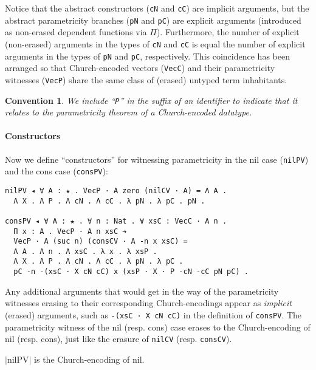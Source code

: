 \documentclass[a4paper,envcountsame,envcountsect]{llncs}
\newtheorem{convention}{Convention}
\newcommand{\lablem}[1]{\label{lem:#1}}
\newcommand{\erase}[1]{\ensuremath{\lvert #1 \rvert}}
\newcommand{\name}[1]{\textrm{#1}}
\begin{document}
Notice that the abstract constructors (\texttt{cN} and \texttt{cC})
are implicit arguments, but the abstract parametricity
branches (\texttt{pN} and \texttt{pC}) are explicit arguments
(introduced as non-erased dependent functions via $\Pi$).
Furthermore, the number of explicit (non-erased) arguments in the types of
\texttt{cN} and \texttt{cC} is equal the number of explicit arguments
in the types of \texttt{pN} and \texttt{pC}, respectively. This
coincidence has been arranged so that Church-encoded vectors
(\texttt{VecC}) and their parametricity witnesses (\texttt{VecP})
share the same class of (erased) untyped term inhabitants.

\begin{convention}
We include ``\texttt{P}'' in
the suffix of an identifier to indicate that it relates to
the parametricity theorem of a Church-encoded datatype.
\end{convention}

\paragraph{Constructors}

Now we define ``constructors'' for witnessing parametricity in the
nil case (\texttt{nilPV}) and the cons case (\texttt{consPV}):

\begin{verbatim}
nilPV ◂ ∀ A : ★ . VecP · A zero (nilCV · A) = Λ A .
  Λ X . Λ P . Λ cN . Λ cC . λ pN . λ pC . pN .

consPV ◂ ∀ A : ★ . ∀ n : Nat . ∀ xsC : VecC · A n .
  Π x : A . VecP · A n xsC ➔ 
  VecP · A (suc n) (consCV · A -n x xsC) =
  Λ A . Λ n . Λ xsC . λ x . λ xsP .
  Λ X . Λ P . Λ cN . Λ cC . λ pN . λ pC .
  pC -n -(xsC · X cN cC) x (xsP · X · P -cN -cC pN pC) .
\end{verbatim}

Any additional arguments that would get in the way of the
parametricity witnesses erasing to their corresponding
Church-encodings appear as \textit{implicit} (erased) arguments,
such as \texttt{-(xsC · X cN cC)} in the definition of \texttt{consPV}.
The parametricity witness of the nil (resp. cons) case erases to the
Church-encoding of nil (resp. cons),
just like the erasure of \texttt{nilCV} (resp. \texttt{consCV}).

\begin{lemma}
\erase{\name{nilPV}} is the Church-encoding of nil.
\lablem{nilpv}
\end{lemma}
\end{document}
